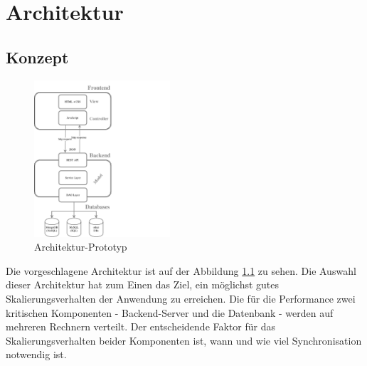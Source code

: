 \chapter{Architektur}

\section{Konzept}


\begin{figure}[H]
\vspace{-30pt}%
\centering
\includegraphics[trim = 0mm 0mm 0mm 0mm, clip, width=0.45\textwidth]{resources/architectureMyAppWithoutFrameworks}
\caption[Architektur-Prototyp]{Architektur-Prototyp}
\label{img:architectureMyApp}
\end{figure}

Die vorgeschlagene Architektur ist auf der Abbildung \ref{img:architectureMyApp} zu sehen. Die Auswahl dieser Architektur hat zum Einen das Ziel, ein möglichst gutes Skalierungsverhalten der Anwendung zu erreichen. Die für die Performance zwei kritischen Komponenten - Backend-Server und die Datenbank - werden auf mehreren Rechnern verteilt. Der entscheidende Faktor für das Skalierungsverhalten beider Komponenten ist, wann und wie viel Synchronisation notwendig ist. 

